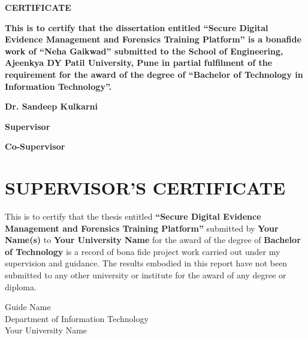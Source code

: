 \documentclass[12pt,a4paper]{report}
\begin{document}
\vspace{0.8cm}

\begin{center}
    {\Huge \bfseries CERTIFICATE}
\end{center}

\vspace{1.2cm}

{\large\bfseries
This is to certify that the dissertation entitled ``Secure Digital Evidence Management and Forensics Training Platform'' is a bonafide work of ``Neha Gaikwad'' submitted to the School of Engineering, Ajeenkya DY Patil University, Pune in partial fulfilment of the requirement for the award of the degree of ``Bachelor of Technology in Information Technology''.
}

\vfill

\noindent
\begin{minipage}[t]{0.45\textwidth}
    \centering
    {\Large \bfseries Dr. Sandeep Kulkarni\par}
    \vspace{0.5cm}
    {\Large \bfseries Supervisor\par}
\end{minipage}
\hfill
\begin{minipage}[t]{0.45\textwidth}
    \centering
    {\Large \bfseries Co-Supervisor\par}
\end{minipage}

\clearpage

\clearpage

\chapter*{SUPERVISOR'S CERTIFICATE}

This is to certify that the thesis entitled \textbf{``Secure Digital Evidence Management and Forensics Training Platform''} submitted by \textbf{Your Name(s)} to \textbf{Your University Name} for the award of the degree of \textbf{Bachelor of Technology} is a record of bona fide project work carried out under my supervision and guidance. The results embodied in this report have not been submitted to any other university or institute for the award of any degree or diploma.

\vspace{2cm}

Guide Name\\
Department of Information Technology\\
Your University Name
\end{document}
